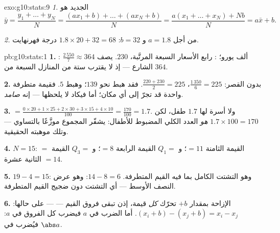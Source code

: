 \begin{solution}{exo:g10:stats:9}
\emph{1.}  الجديد هو
\[
\bar y = \frac{y_1 + \dots + y_N}{N}
= \frac{(a x_1 + b) + \dots + (a x_N + b)}{N}
= \frac{a(x_1 + \dots + x_N) + Nb}{N}
= a \bar x + b .
\]

\emph{2.} من أجل $a = 1.8$ و $b = 32$: 
$1.8 \times 20 + 32 = 68$ درجة فهرنهايت.
\end{solution}

\begin{solution}{pb:g10:stats:1}
\textbf{1.} : $\frac{2\,550}{7} \approx 364$ ألف
يورو؛ : رابع الأسعار السبعة المرتَّبة، $230$.
 يصف الشارع --- إذ لا يقترب ستة من المنازل السبعة
من $364$.

\textbf{2.} بدون القصر:  $\frac{1\,350}{6} = 225$،
 $\frac{220 + 230}{2} = 225$. فقد هبط  نحو
$139$؛ وهبط  $5$. فقيمة متطرفة واحدة قد تجرّ 
إلى أي مكان؛ أما  فيكاد لا يلحظها --- إنه \emph{صامد}.

\textbf{3.}  $= \frac{0 \times 20 + 1 \times 25 + 2 \times
30 + 3 \times 15 + 4 \times 10}{100} = \frac{170}{100} = 1.7$.
ولا أسرة لها $1.7$ طفل، لكن $1.7 \times 100 = 170$
\emph{هو} العدد الكلي المضبوط للأطفال:  يشفّر
المجموع موزَّعًا بالتساوي --- وتلك موهبته الحقيقية.

\textbf{4.} $N = 15$:  $=$ القيمة الثامنة $= 11$؛
و $Q_1 =$ القيمة الرابعة $= 8$؛ و $Q_3 =$ القيمة الثانية عشرة $= 14$.

\textbf{5.}  $19 - 4 = 15$: وهو التشتت الكامل بما فيه
القيم المتطرفة.  $14 - 8 = 6$: وهو عرض
النصف الأوسط --- أي التشتت دون ضجيج القيم المتطرفة.

\textbf{6.} الإزاحة بمقدار $+b$ تحرّك \emph{كل} قيمة، إذن تبقى
فروق القيم ---   --- على حالها:
$(x_i + b) - (x_j + b) = x_i - x_j$. أما الضرب في $a$ فيضرب
كل الفروق في $a$: فيُضرب   في
$\abs a$.


\end{solution}
